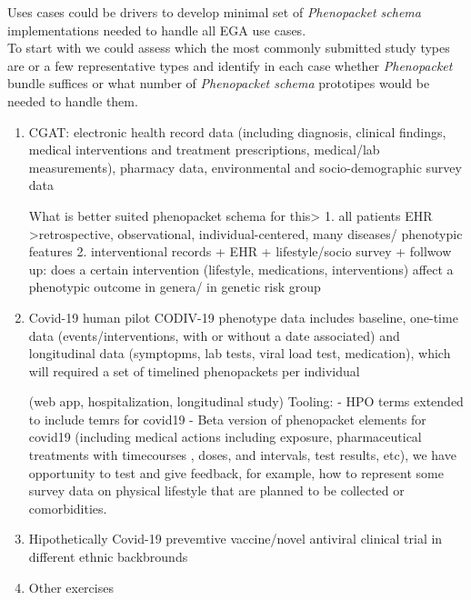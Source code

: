 \documentclass[a4paper, 10pt]{article}        %
\begin{document}
Uses cases could be drivers to develop minimal set of \textit{Phenopacket schema} implementations needed to handle all EGA use cases.\\
To start with we could assess which the most commonly submitted study types are or a few representative types and identify in each case whether \textit{Phenopacket} bundle suffices or what number of \textit{Phenopacket schema} prototipes would be needed to handle them.

\begin{enumerate}

\item CGAT: electronic health record data (including diagnosis, clinical findings, medical interventions and treatment prescriptions, medical/lab measurements), pharmacy data, environmental and socio-demographic survey data

What is better suited phenopacket schema for this> 
1. all patients EHR >retrospective, observational, individual-centered, many diseases/ phenotypic features
2. interventional records + EHR + lifestyle/socio survey + follwow up: does a certain intervention (lifestyle, medications, interventions) affect a phenotypic outcome in genera/ in genetic risk group


\item Covid-19 human pilot
CODIV-19 phenotype data includes baseline, one-time data  (events/interventions, with or without a date associated) and longitudinal data (symptopms, lab tests, viral load test, medication), which will required a set of timelined phenopackets per individual 

 (web app, hospitalization, longitudinal study) 
Tooling: 
- HPO terms extended to include temrs for covid19 
- Beta version of phenopacket elements for covid19 (including medical actions including exposure, pharmaceutical treatments with timecourses , doses, and intervals, test results, etc), we have opportunity to test and give feedback, for example, how to represent some survey data on physical lifestyle that are planned to be collected or comorbidities.


\item Hipothetically Covid-19 prevemtive vaccine/novel antiviral clinical trial in different ethnic backbrounds

\item Other exercises


\end{enumerate}
\end{document}

